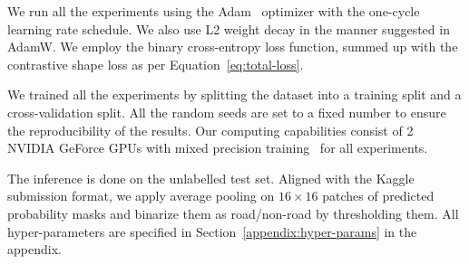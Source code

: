 We run all the experiments using the Adam~\cite{adam} optimizer with the one-cycle~\cite{one-cycle-lr} learning rate schedule.
We also use L2 weight decay in the manner suggested in AdamW\cite{adamw}.
We employ the binary cross-entropy loss function, summed up with the contrastive shape loss as per Equation~\ref{eq:total-loss}.

We trained all the experiments by splitting the dataset into a training split and a cross-validation split.
All the random seeds are set to a fixed number to ensure the reproducibility of the results.
Our computing capabilities consist of 2 NVIDIA\textsuperscript{\textregistered} GeForce\textsuperscript{\textregistered} GPUs with mixed precision training~\cite{amp} for all experiments.

The inference is done on the unlabelled test set.
Aligned with the Kaggle submission format, we apply average pooling on $16\times 16$ patches of predicted probability masks and binarize them as road/non-road by thresholding them.
All hyper-parameters are specified in Section~\ref{appendix:hyper-params} in the appendix.